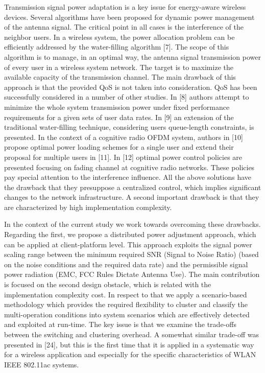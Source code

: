 Transmission signal power adaptation is a key issue for energy-aware wireless devices. Several algorithms have been proposed for dynamic power management of the antenna signal. The critical point in all cases is the interference of the neighbor users. In a wireless system, the power allocation problem can be efficiently addressed by the water-filling algorithm [7]. The scope of this algorithm is to manage, in an optimal way, the antenna signal transmission power of every user in a wireless system network. The target is to maximize the available capacity of the transmission channel. The main drawback of this approach is that the provided QoS is not taken into consideration. QoS has been successfully considered in a number of other studies. In [8] authors attempt to minimize the whole system transmission power under fixed performance requirements for a given sets of user data rates. In [9] an extension of the traditional water-filling technique, considering users queue-length constraints, is presented. In the context of a cognitive radio OFDM system, authors in [10] propose optimal power loading schemes for a single user and extend their proposal for multiple users in [11]. In [12] optimal power control policies are presented focusing on fading channel at cognitive radio networks. These policies pay special attention to the interference influence. All the above solutions have the drawback that they presuppose a centralized control, which implies significant changes to the network infrastructure. A second important drawback is that they are characterized by high implementation complexity.

In the context of the current study we work towards overcoming these drawbacks. Regarding the first, we propose a distributed power adjustment approach, which can be applied at client-platform level. This approach exploits the signal power scaling range between the minimum required SNR (Signal to Noise Ratio) (based on the noise conditions and the required data rate) and the permissible signal power radiation (EMC, FCC Rules Dictate Antenna Use). The main contribution is focused on the second design obstacle, which is related with the implementation complexity cost. In respect to that we apply a scenario-based methodology which provides the required flexibility to cluster and classify the multi-operation conditions into system scenarios which are effectively detected and exploited at run-time. The key issue is that we examine the trade-offs between the switching and clustering overhead. A somewhat similar trade-off was presented in [24], but this is the first time that it is applied in a systematic way for a wireless application and especially for the specific characteristics of WLAN IEEE 802.11ac systems.

